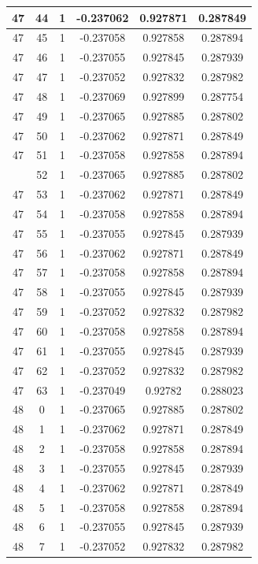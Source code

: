\documentclass[12pt,a4paper]{article}
\numberwithin{equation}{section}
\numberwithin{figure}{section}
\numberwithin{table}{section}
\begin{document}
\begin{longtable}{|c|c|c|c|c|c|}
47 & 44 & 1 & -0.237062 & 0.927871 & 0.287849 \\ \hline
47 & 45 & 1 & -0.237058 & 0.927858 & 0.287894 \\ \hline
47 & 46 & 1 & -0.237055 & 0.927845 & 0.287939 \\ \hline
47 & 47 & 1 & -0.237052 & 0.927832 & 0.287982 \\ \hline
47 & 48 & 1 & -0.237069 & 0.927899 & 0.287754 \\ \hline
47 & 49 & 1 & -0.237065 & 0.927885 & 0.287802 \\ \hline
47 & 50 & 1 & -0.237062 & 0.927871 & 0.287849 \\ \hline
47 & 51 & 1 & -0.237058 & 0.927858 & 0.287894 \\ \hline
\pagebreak
47 & 52 & 1 & -0.237065 & 0.927885 & 0.287802 \\ \hline
47 & 53 & 1 & -0.237062 & 0.927871 & 0.287849 \\ \hline
47 & 54 & 1 & -0.237058 & 0.927858 & 0.287894 \\ \hline
47 & 55 & 1 & -0.237055 & 0.927845 & 0.287939 \\ \hline
47 & 56 & 1 & -0.237062 & 0.927871 & 0.287849 \\ \hline
47 & 57 & 1 & -0.237058 & 0.927858 & 0.287894 \\ \hline
47 & 58 & 1 & -0.237055 & 0.927845 & 0.287939 \\ \hline
47 & 59 & 1 & -0.237052 & 0.927832 & 0.287982 \\ \hline
47 & 60 & 1 & -0.237058 & 0.927858 & 0.287894 \\ \hline
47 & 61 & 1 & -0.237055 & 0.927845 & 0.287939 \\ \hline
47 & 62 & 1 & -0.237052 & 0.927832 & 0.287982 \\ \hline
47 & 63 & 1 & -0.237049 & 0.92782 & 0.288023 \\ \hline
48 & 0 & 1 & -0.237065 & 0.927885 & 0.287802 \\ \hline
48 & 1 & 1 & -0.237062 & 0.927871 & 0.287849 \\ \hline
48 & 2 & 1 & -0.237058 & 0.927858 & 0.287894 \\ \hline
48 & 3 & 1 & -0.237055 & 0.927845 & 0.287939 \\ \hline
48 & 4 & 1 & -0.237062 & 0.927871 & 0.287849 \\ \hline
48 & 5 & 1 & -0.237058 & 0.927858 & 0.287894 \\ \hline
48 & 6 & 1 & -0.237055 & 0.927845 & 0.287939 \\ \hline
48 & 7 & 1 & -0.237052 & 0.927832 & 0.287982 \\ \hline

\end{longtable}
\end{document}
